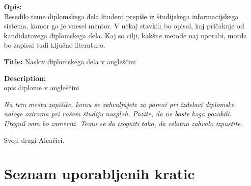 \documentclass[a4paper,12pt,openright]{book}
\newcommand{\clearemptydoublepage}{\newpage{\pagestyle{empty}\cleardoublepage}}
\begin{document}
\bigskip
\noindent\textbf{Opis:}\\
Besedilo teme diplomskega dela študent prepiše iz študijskega informacijskega sistema, kamor ga je vnesel mentor. 
V nekaj stavkih bo opisal, kaj pričakuje od kandidatovega diplomskega dela. 
Kaj so cilji, kakšne metode naj uporabi, morda bo zapisal tudi ključno literaturo.

\bigskip
\noindent\textbf{Title:} Naslov diplomskega dela v angleščini

\bigskip
\noindent\textbf{Description:}\\
opis diplome v angleščini

\vfill



\vspace{2cm}

\clearemptydoublepage

\thispagestyle{empty}\mbox{}\vfill\null\it%
\noindent
Na tem mestu zapišite, komu se zahvaljujete za pomoč pri izdelavi diplomske naloge oziroma pri vašem študiju nasploh. Pazite, da ne boste koga pozabili. Utegnil vam bo zameriti. Temu se da izogniti tako, da celotno zahvalo izpustite.
\rm\normalfont

\clearemptydoublepage

\thispagestyle{empty}\mbox{}{\textheight}\mbox{}\hfill\begin{minipage}{0.55\textwidth}%
Svoji dragi Alenčici.
\normalfont\end{minipage}

\clearemptydoublepage


\pagestyle{empty}

\def\thepage{}%
\tableofcontents{}
\mainmatter 


\clearemptydoublepage


\chapter*{Seznam uporabljenih kratic}
\end{document}
